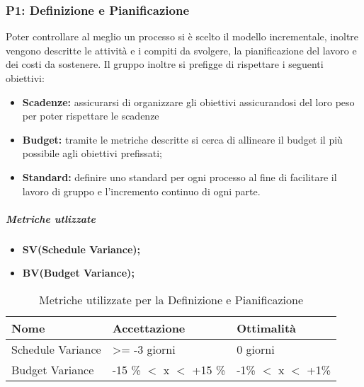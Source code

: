 \subsubsection{P1: Definizione e Pianificazione}
Poter controllare al meglio un processo si è scelto il modello incrementale, inoltre vengono descritte le attività e i compiti da svolgere, la pianificazione del lavoro e dei costi da sostenere. Il gruppo inoltre si prefigge di rispettare i seguenti obiettivi:
\begin{itemize}
		\item{\textbf{Scadenze:} assicurarsi di organizzare gli obiettivi assicurandosi del loro peso per poter rispettare le scadenze}
		\item{\textbf{Budget:} tramite le metriche descritte si cerca di allineare il budget il più possibile agli obiettivi prefissati;}
		\item{\textbf{Standard:} definire uno standard per ogni processo al fine di facilitare il lavoro di gruppo e l'incremento continuo di ogni parte.}
\end{itemize} 
\subparagraph{Metriche utlizzate}
\begin{itemize}
	\item{\textbf{SV(Schedule Variance);}}
	\item{\textbf{BV(Budget Variance);}}
\end{itemize}
\begin{table}[!htpb]
	\centering
	\renewcommand{\arraystretch}{2} 
	\begin{tabular}{|l|l|l|}
		\hline
		\rowcolor{orange!50} 
		\textbf{Nome} & \textbf{Accettazione} & \textbf{Ottimalità} \\
		\hline
		Schedule Variance & \textgreater = -3 giorni &0 giorni \\
		\hline
		Budget Variance & -15 \% $<$ x $<$ +15 \% & -1\% $<$ x $<$ +1\% \\ 
		\hline
	\end{tabular}
	\caption{Metriche utilizzate per la Definizione e Pianificazione}
\end{table}

